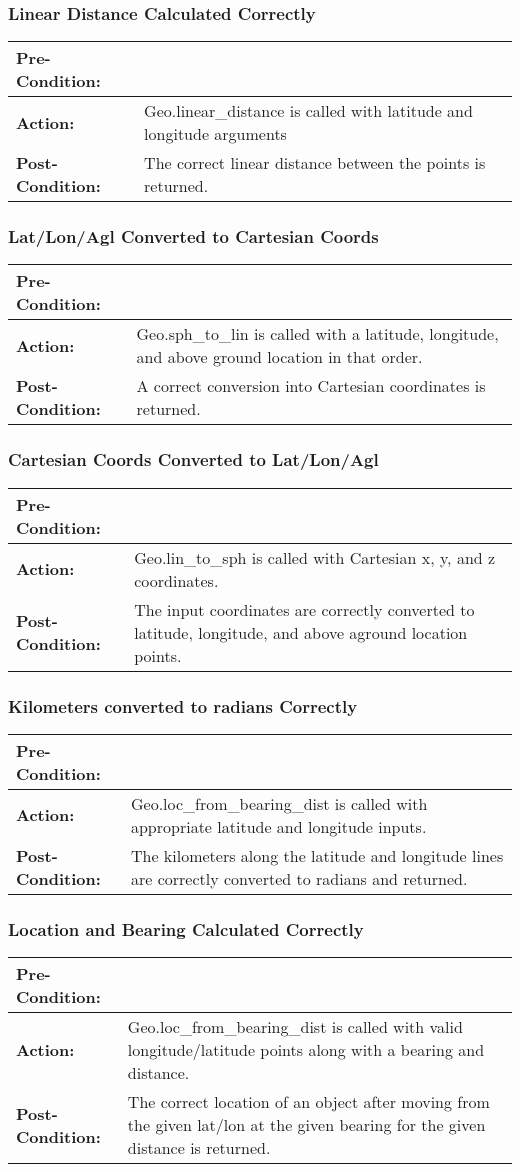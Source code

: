\documentclass[titlepage]{article}
\newcommand{\testcase}[3]{
    \begin{center}
    \begin{tabular}{| l | p{0.7\textwidth}|}
        \hline
        \rowcolor[gray]{0.8}\textbf{Pre-Condition:} & #1 \\ \hline
        \textbf{Action:} & #2 \\ \hline
        \rowcolor[gray]{0.8}\textbf{Post-Condition:} & #3 \\ \hline
    \end{tabular}
    \end{center}
}
\begin{document}
\subsubsection{Linear Distance Calculated Correctly}
\testcase{}{Geo.linear\_distance is called with latitude and longitude arguments}{The correct linear distance between
the points is returned.}

\subsubsection{Lat/Lon/Agl Converted to Cartesian Coords}
\testcase{}{Geo.sph\_to\_lin is called with a latitude, longitude, and above ground location in that order.}{A
correct conversion into Cartesian coordinates is returned.}

\subsubsection{Cartesian Coords Converted to Lat/Lon/Agl}
\testcase{}{Geo.lin\_to\_sph is called with Cartesian x, y, and z coordinates.}{The input coordinates are correctly
converted to latitude, longitude, and above aground location points.}

\subsubsection{Kilometers converted to radians Correctly}
\testcase{}{Geo.loc\_from\_bearing\_dist is called with appropriate latitude and longitude inputs.}{The kilometers along
the latitude and longitude lines are
correctly converted to radians and returned.}

\subsubsection{Location and Bearing Calculated Correctly}
\testcase{}{Geo.loc\_from\_bearing\_dist is called with valid longitude/latitude points along with a bearing and
distance.}{The correct location of an object after moving from the given lat/lon at the given bearing for the given
distance is returned.}





\pagebreak
\appendix
\appendixpage
\end{document}
